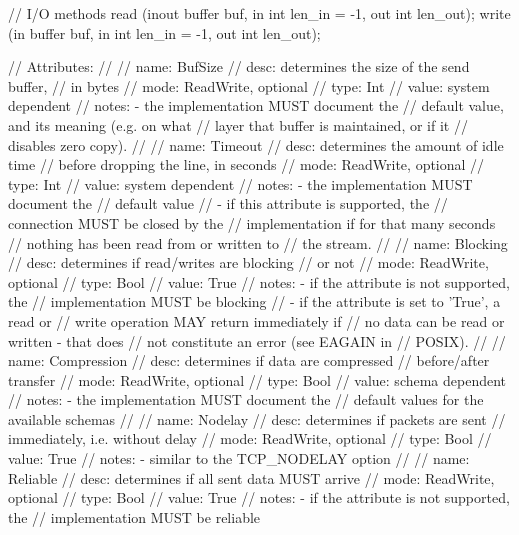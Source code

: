\begin{myspec}
{{      // I/O methods
      read         (inout buffer           buf, 
                    in    int              len_in = -1,
                    out   int              len_out);
      write        (in    buffer           buf,
                    in    int              len_in = -1,
                    out   int              len_out);
 
      // Attributes:
      //
      //   name:  BufSize
      //   desc:  determines the size of the send buffer, 
      //          in bytes
      //   mode:  ReadWrite, optional
      //   type:  Int
      //   value: system dependent
      //   notes: - the implementation MUST document the
      //            default value, and its meaning (e.g. on what
      //            layer that buffer is maintained, or if it
      //            disables zero copy).
      //
      //   name:  Timeout
      //   desc:  determines the amount of idle time
      //          before dropping the line, in seconds
      //   mode:  ReadWrite, optional
      //   type:  Int
      //   value: system dependent
      //   notes: - the implementation MUST document the
      //            default value
      //          - if this attribute is supported, the
      //            connection MUST be closed by the
      //            implementation if for that many seconds
      //            nothing has been read from or written to 
      //            the stream.
      //
      //   name:  Blocking
      //   desc:  determines if read/writes are blocking
      //          or not
      //   mode:  ReadWrite, optional
      //   type:  Bool
      //   value: True
      //   notes: - if the attribute is not supported, the
      //            implementation MUST be blocking
      //          - if the attribute is set to 'True', a read or
      //            write operation MAY return immediately if
      //            no data can be read or written - that does
      //            not constitute an error (see EAGAIN in
      //            POSIX).
      //
      //   name:  Compression
      //   desc:  determines if data are compressed
      //          before/after transfer
      //   mode:  ReadWrite, optional
      //   type:  Bool
      //   value: schema dependent
      //   notes: - the implementation MUST document the
      //            default values for the available schemas
      //
      //   name:  Nodelay
      //   desc:  determines if packets are sent
      //          immediately, i.e. without delay
      //   mode:  ReadWrite, optional
      //   type:  Bool
      //   value: True
      //   notes: - similar to the TCP_NODELAY option
      //
      //   name:  Reliable
      //   desc:  determines if all sent data MUST arrive
      //   mode:  ReadWrite, optional
      //   type:  Bool
      //   value: True
      //   notes: - if the attribute is not supported, the
      //            implementation MUST be reliable
 
}}
\end{myspec}
